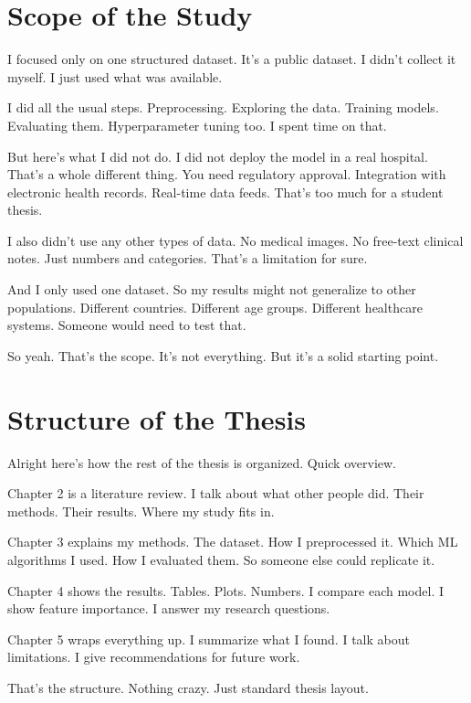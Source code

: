 \documentclass[12pt, a4paper, oneside]{book}
\begin{document}
\section{Scope of the Study}

I focused only on one structured dataset. It's a public dataset. I didn't collect it myself. I just used what was available.

I did all the usual steps. Preprocessing. Exploring the data. Training models. Evaluating them. Hyperparameter tuning too. I spent time on that.

But here's what I did not do. I did not deploy the model in a real hospital. That's a whole different thing. You need regulatory approval. Integration with electronic health records. Real-time data feeds. That's too much for a student thesis.

I also didn't use any other types of data. No medical images. No free-text clinical notes. Just numbers and categories. That's a limitation for sure.

And I only used one dataset. So my results might not generalize to other populations. Different countries. Different age groups. Different healthcare systems. Someone would need to test that.

So yeah. That's the scope. It's not everything. But it's a solid starting point.

\section{Structure of the Thesis}

Alright here's how the rest of the thesis is organized. Quick overview.

Chapter 2 is a literature review. I talk about what other people did. Their methods. Their results. Where my study fits in.

Chapter 3 explains my methods. The dataset. How I preprocessed it. Which ML algorithms I used. How I evaluated them. So someone else could replicate it.

Chapter 4 shows the results. Tables. Plots. Numbers. I compare each model. I show feature importance. I answer my research questions.

Chapter 5 wraps everything up. I summarize what I found. I talk about limitations. I give recommendations for future work.

That's the structure. Nothing crazy. Just standard thesis layout.

\end{document}
